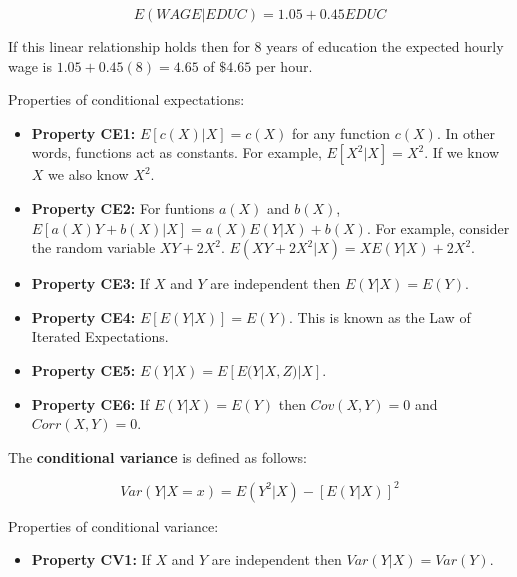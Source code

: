 \documentclass[11pt]{article}
\begin{document}
\begin{equation*}
E(WAGE|EDUC) = 1.05 + 0.45 EDUC
\end{equation*}

If this linear relationship holds then for $8$ years of education the expected hourly wage is $1.05 + 0.45(8) = 4.65$
of $\$4.65$ per hour.

\vspace{2mm}

Properties of conditional expectations:

\begin{itemize}
 \item[] \textbf{Property CE1:} $E[c(X)|X] = c(X)$ for any function $c(X)$. In other words, functions act
         as constants. For example, $E[X^{2}|X] = X^{2}$. If we know $X$ we also know $X^{2}$.
 \item[] \textbf{Property CE2:} For funtions $a(X)$ and $b(X)$, $E[a(X)Y + b(X)|X] = a(X)E(Y|X) + b(X)$.
         For example, consider the random variable $XY + 2X^{2}$. $E(XY + 2X^{2}|X) = XE(Y|X) + 2X^{2}$.
 \item[] \textbf{Property CE3:} If $X$ and $Y$ are independent then $E(Y|X) = E(Y)$.
 \item[] \textbf{Property CE4:} $E[E(Y|X)] = E(Y)$. This is known as the Law of Iterated Expectations.
 \item[] \textbf{Property CE5:} $E(Y|X) = E[E(Y|X,Z)|X]$.
 \item[] \textbf{Property CE6:} If $E(Y|X) = E(Y)$ then $Cov(X,Y) = 0$ and $Corr(X,Y) = 0$.
\end{itemize}

\vspace{2mm}

The \textbf{conditional variance} is defined as follows:

\begin{equation*}
Var(Y|X=x) = E(Y^{2}|X) - [E(Y|X)]^{2}
\end{equation*}

\vspace{2mm}

Properties of conditional variance:

\begin{itemize}
 \item[] \textbf{Property CV1:} If $X$ and $Y$ are independent then $Var(Y|X) = Var(Y)$.
\end{itemize}

\vspace{2mm}
\end{document}
